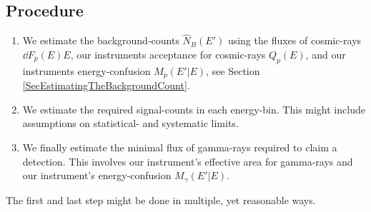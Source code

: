 \documentclass{article}%
\begin{document}
\subsection{Procedure}
%
\begin{enumerate}
\item We estimate the background-counts $\hat{N}_B(E')$ using the fluxes of cosmic-rays $\dd{F_p(E)}{E}$, our instruments acceptance for cosmic-rays $Q_p(E)$, and our instruments energy-confusion $M_p(E'\vert E)$, see Section \ref{SecEstimatingTheBackgroundCount}.
%
\item We estimate the required signal-counts in each energy-bin. This might include assumptions on statistical- and systematic limits.
%
\item We finally estimate the minimal flux of gamma-rays required to claim a detection. This involves our instrument's effective area for gamma-rays and our instrument's energy-confusion $M_{\gamma}(E'\vert E)$. 
%
\end{enumerate}
%
The first and last step might be done in multiple, yet reasonable ways.
%
\end{document}
